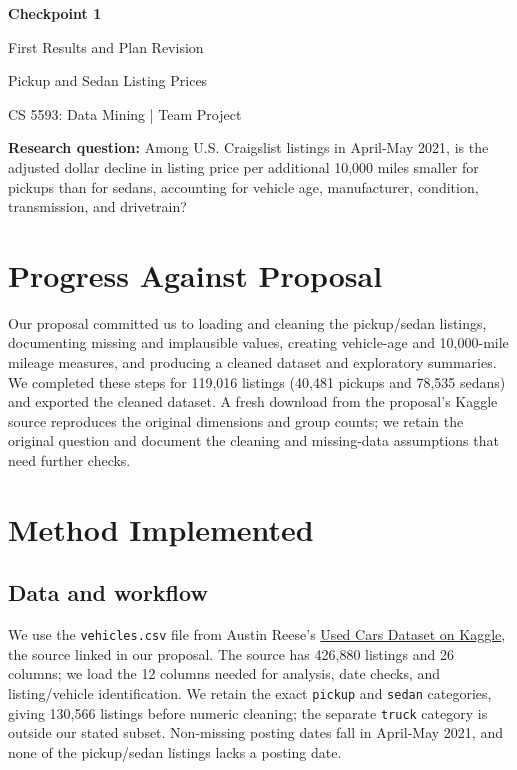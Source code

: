 \documentclass[10pt,letterpaper]{article}
\begin{document}
\begin{center}
{\LARGE\bfseries Checkpoint 1}\par
\vspace{4pt}
{\large First Results and Plan Revision}\par
\vspace{4pt}
{\normalsize Pickup and Sedan Listing Prices}\par
\vspace{3pt}
{\small CS 5593: Data Mining | Team Project}
\end{center}
\vspace{3pt}


\textbf{Research question:} Among U.S. Craigslist listings in April-May 2021, is the adjusted dollar decline in listing price per additional 10,000 miles smaller for pickups than for sedans, accounting for vehicle age, manufacturer, condition, transmission, and drivetrain?


\section{Progress Against Proposal}

Our proposal committed us to loading and cleaning the pickup/sedan listings, documenting missing and implausible values, creating vehicle-age and 10,000-mile mileage measures, and producing a cleaned dataset and exploratory summaries. We completed these steps for 119,016 listings (40,481 pickups and 78,535 sedans) and exported the cleaned dataset. A fresh download from the proposal's Kaggle source reproduces the original dimensions and group counts; we retain the original question and document the cleaning and missing-data assumptions that need further checks.


\section{Method Implemented}

\subsection*{Data and workflow}

We use the \texttt{vehicles.csv} file from Austin Reese's \href{https://www.kaggle.com/datasets/austinreese/craigslist-carstrucks-data}{Used Cars Dataset on Kaggle}, the source linked in our proposal. The source has 426,880 listings and 26 columns; we load the 12 columns needed for analysis, date checks, and listing/vehicle identification. We retain the exact \texttt{pickup} and \texttt{sedan} categories, giving 130,566 listings before numeric cleaning; the separate \texttt{truck} category is outside our stated subset. Non-missing posting dates fall in April-May 2021, and none of the pickup/sedan listings lacks a posting date.
\end{document}
